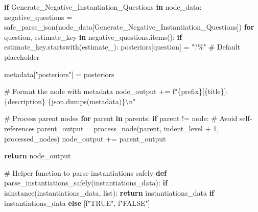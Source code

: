 \documentclass[
  11pt,
  letterpaper,
]{book}
\newenvironment{Shaded}{\begin{snugshade}}{\end{snugshade}}
\newcommand{\BuiltInTok}[1]{\textcolor[rgb]{0.00,0.23,0.31}{#1}}
\newcommand{\CharTok}[1]{\textcolor[rgb]{0.13,0.47,0.30}{#1}}
\newcommand{\CommentTok}[1]{\textcolor[rgb]{0.37,0.37,0.37}{#1}}
\newcommand{\ControlFlowTok}[1]{\textcolor[rgb]{0.00,0.23,0.31}{\textbf{#1}}}
\newcommand{\DecValTok}[1]{\textcolor[rgb]{0.68,0.00,0.00}{#1}}
\newcommand{\KeywordTok}[1]{\textcolor[rgb]{0.00,0.23,0.31}{\textbf{#1}}}
\newcommand{\NormalTok}[1]{\textcolor[rgb]{0.00,0.23,0.31}{#1}}
\newcommand{\OperatorTok}[1]{\textcolor[rgb]{0.37,0.37,0.37}{#1}}
\newcommand{\SpecialCharTok}[1]{\textcolor[rgb]{0.37,0.37,0.37}{#1}}
\newcommand{\SpecialStringTok}[1]{\textcolor[rgb]{0.13,0.47,0.30}{#1}}
\newcommand{\StringTok}[1]{\textcolor[rgb]{0.13,0.47,0.30}{#1}}
\begin{document}
\begin{Shaded}
\begin{Highlighting}[]
          \ControlFlowTok{if} \StringTok{\textquotesingle{}Generate\_Negative\_Instantiation\_Questions\textquotesingle{}} \KeywordTok{in}\NormalTok{ node\_data:}
\NormalTok{              negative\_questions }\OperatorTok{=}\NormalTok{ safe\_parse\_json(node\_data[}\StringTok{\textquotesingle{}Generate\_Negative\_Instantiation\_Questions\textquotesingle{}}\NormalTok{])}
              \ControlFlowTok{for}\NormalTok{ question, estimate\_key }\KeywordTok{in}\NormalTok{ negative\_questions.items():}
                  \ControlFlowTok{if}\NormalTok{ estimate\_key.startswith(}\StringTok{\textquotesingle{}estimate\_\textquotesingle{}}\NormalTok{):}
\NormalTok{                      posteriors[question] }\OperatorTok{=} \StringTok{"?\%"}  \CommentTok{\# Default placeholder}

\NormalTok{          metadata[}\StringTok{"posteriors"}\NormalTok{] }\OperatorTok{=}\NormalTok{ posteriors}

      \CommentTok{\# Format the node with metadata}
\NormalTok{      node\_output }\OperatorTok{+=} \SpecialStringTok{f"}\SpecialCharTok{\{}\NormalTok{prefix}\SpecialCharTok{\}}\SpecialStringTok{[}\SpecialCharTok{\{}\NormalTok{title}\SpecialCharTok{\}}\SpecialStringTok{]: }\SpecialCharTok{\{}\NormalTok{description}\SpecialCharTok{\}}\SpecialStringTok{ }\SpecialCharTok{\{}\NormalTok{json}\SpecialCharTok{.}\NormalTok{dumps(metadata)}\SpecialCharTok{\}}\CharTok{\textbackslash{}n}\SpecialStringTok{"}

      \CommentTok{\# Process parent nodes}
      \ControlFlowTok{for}\NormalTok{ parent }\KeywordTok{in}\NormalTok{ parents:}
          \ControlFlowTok{if}\NormalTok{ parent }\OperatorTok{!=}\NormalTok{ node:  }\CommentTok{\# Avoid self{-}references}
\NormalTok{              parent\_output }\OperatorTok{=}\NormalTok{ process\_node(parent, indent\_level }\OperatorTok{+} \DecValTok{1}\NormalTok{, processed\_nodes)}
\NormalTok{              node\_output }\OperatorTok{+=}\NormalTok{ parent\_output}

      \ControlFlowTok{return}\NormalTok{ node\_output}

  \CommentTok{\# Helper function to parse instantiations safely}
  \KeywordTok{def}\NormalTok{ parse\_instantiations\_safely(instantiations\_data):}
      \ControlFlowTok{if} \BuiltInTok{isinstance}\NormalTok{(instantiations\_data, }\BuiltInTok{list}\NormalTok{):}
          \ControlFlowTok{return}\NormalTok{ instantiations\_data }\ControlFlowTok{if}\NormalTok{ instantiations\_data }\ControlFlowTok{else}\NormalTok{ [}\SpecialStringTok{f"TRUE"}\NormalTok{, }\SpecialStringTok{f"FALSE"}\NormalTok{]}


\end{Highlighting}
\end{Shaded}
\end{document}
